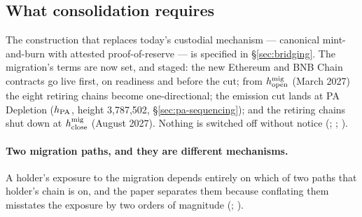 \subsection{What consolidation requires}
\label{sec:pa-requirements}

The construction that replaces today's custodial \Fusion mechanism — canonical mint-and-burn with
attested proof-of-reserve — is specified in \S\ref{sec:bridging}. The migration's terms are now set, and
staged: the new Ethereum and BNB Chain contracts go live first, on readiness and before the cut; from
$h^{\mathrm{mig}}_{\mathrm{open}}$ (March 2027) the eight retiring chains become one-directional; the emission cut lands at PA
Depletion ($h_{\mathrm{PA}}$, height 3{,}787{,}502, \S\ref{sec:pa-sequencing}); and the retiring chains shut
down at $h^{\mathrm{mig}}_{\mathrm{close}}$ (August 2027). Nothing is switched off without notice (\planned;
; ).

\paragraph{Two migration paths, and they are different mechanisms.} A holder's exposure to the
migration depends entirely on which of two paths that holder's chain is on, and the paper separates
them because conflating them misstates the exposure by two orders of magnitude
(\planned; ).

